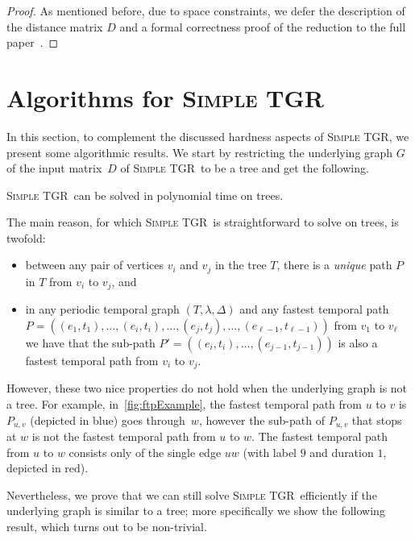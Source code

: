 \documentclass[a4paper,UKenglish,cleveref, autoref, thm-restate]{lipics-v2021}
\newcommand{\deltaExact}{\textsc{Simple TGR}}
\begin{document}
\begin{proof}
As mentioned before, due to space constraints, we defer the description of the distance matrix $D$ and a formal correctness proof of the reduction to the full paper~\cite{fullPaper}.
\end{proof}



\section{Algorithms for \deltaExact}
In this section, to complement the discussed hardness aspects of \deltaExact, we present some algorithmic results.
We start by restricting the underlying graph $G$ of the input matrix~$D$ of \deltaExact\ to be a tree and get the following.
\begin{theorem}[$\star$] \label{thm:deltaExact-PolyTimeTrees}
    \deltaExact\ can be solved in polynomial time on trees.
\end{theorem}
The main reason, for which \deltaExact\ is straightforward to solve on trees, is twofold: 
\begin{itemize}
    \item between any pair of vertices $v_i$ and $v_j$ in the tree $T$, there is a \emph{unique} path $P$ in $T$ from $v_i$ to $v_j$, and 
    \item in any periodic temporal graph $(T,\lambda,\Delta)$ and any fastest temporal path $P=((e_1,t_1),\ldots,(e_i,t_i),\ldots,(e_j,t_j),\ldots,(e_{\ell-1},t_{\ell-1}))$ from $v_1$ to $v_{\ell}$ we have that the sub-path $P'=((e_i,t_i),\ldots,(e_{j-1},t_{j-1}))$ is also a fastest temporal path from $v_i$ to $v_j$.
\end{itemize}
However, these two nice properties do not hold when the underlying graph is not a tree. For example, in~\cref{fig:ftpExample}, the fastest temporal path from $u$ to $v$ is $P_{u,v}$ (depicted in blue) goes through~$w$, however the sub-path of $P_{u,v}$ that stops at $w$ is not the fastest temporal path from $u$ to $w$. The fastest temporal path from $u$ to $w$ consists only of the single edge $uw$ (with label $9$ and duration $1$, depicted in red).

Nevertheless, we prove that we can still solve \deltaExact\ efficiently if the underlying graph is similar to a tree; more specifically we show the following result, which turns out to be non-trivial.
\end{document}
